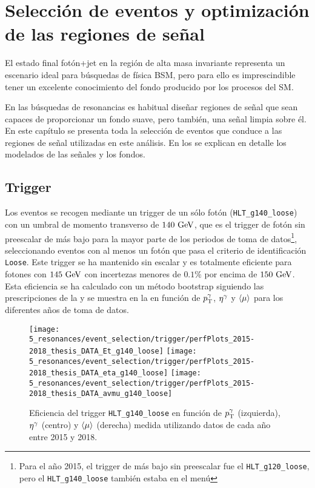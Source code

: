 \chapter{Selección de eventos y optimización de las regiones de señal}
\label{ch:evt_selection}

El estado final fotón+jet en la región de alta masa invariante representa un escenario ideal para búsquedas de física \ac{BSM}, pero para ello es imprescindible tener un excelente conocimiento del fondo producido por los procesos del \ac{SM}.

En las búsquedas de resonancias es habitual diseñar regiones de señal que sean capaces de proporcionar un fondo suave, pero también, una señal limpia sobre él. En este capítulo se presenta toda la selección de eventos que conduce a las regiones de señal utilizadas en este análisis. En los \Chs{\ref{ch:signals}}{\ref{ch:bkg}} se explican en detalle los modelados de las señales y los fondos.


\section{Trigger}
\label{sec:evt_selection:trigger}

Los eventos se recogen mediante un trigger de un sólo fotón (\texttt{HLT\_g140\_loose}) con un umbral de momento transverso de \(140~\text{GeV}\), que es el trigger de fotón sin preescalar de más bajo \pt para la mayor parte de los periodos de toma de datos\footnote{Para el año 2015, el trigger de más bajo \pt sin preescalar fue el \texttt{HLT\_g120\_loose}, pero el \texttt{HLT\_g140\_loose} también estaba en el menú}, seleccionando eventos con al menos un fotón que pasa el criterio de identificación \texttt{Loose}. Este trigger se ha mantenido sin escalar y es totalmente eficiente para fotones con \(145~\text{GeV}\) con incertezas menores de \(0.1\%\) por encima de \(150~\text{GeV}\). Esta eficiencia se ha calculado con un método bootstrap siguiendo las prescripciones de la  y se muestra en la \Fig{\ref{fig:evt_selection:trigger:trigger_perf_15_18}} en función de \(p_{\text{T}}^{\gamma}\), \(\eta^{\gamma}\) y \(\langle \mu \rangle\) para los diferentes años de toma de datos.

\begin{figure}[ht!]
    \centering
    \texttt{[image: 5\_resonances/event\_selection/trigger/perfPlots\_2015-2018\_thesis\_DATA\_Et\_g140\_loose]}
    \texttt{[image: 5\_resonances/event\_selection/trigger/perfPlots\_2015-2018\_thesis\_DATA\_eta\_g140\_loose]}
    \texttt{[image: 5\_resonances/event\_selection/trigger/perfPlots\_2015-2018\_thesis\_DATA\_avmu\_g140\_loose]}
    \caption{Eficiencia del trigger \texttt{HLT\_g140\_loose} en función de \(p_{\text{T}}^{\gamma}\) (izquierda), \(\eta^{\gamma}\) (centro) y \(\langle \mu \rangle\) (derecha) medida utilizando datos de cada año entre 2015 y 2018.}
    \label{fig:evt_selection:trigger:trigger_perf_15_18}
\end{figure}








